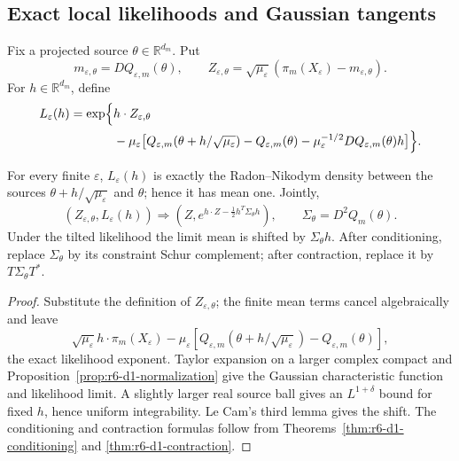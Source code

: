 \subsection{Exact local likelihoods and Gaussian tangents}

Fix a projected source \(\theta\in\mathbb R^{d_m}\).  Put
\[
m_{\varepsilon,\theta}=DQ_{\varepsilon,m}(\theta),
\qquad
Z_{\varepsilon,\theta}=
\sqrt{\mu_\varepsilon}
(\pi_m(X_\varepsilon)-m_{\varepsilon,\theta}).
\]
For \(h\in\mathbb R^{d_m}\), define
\[
\begin{aligned}
L_\varepsilon(h)=\exp\Bigl\{&
 h\cdot Z_{\varepsilon,\theta}\\
&-\mu_\varepsilon\bigl[
Q_{\varepsilon,m}(\theta+h/\sqrt{\mu_\varepsilon})
-Q_{\varepsilon,m}(\theta)
-\mu_\varepsilon^{-1/2}DQ_{\varepsilon,m}(\theta)h
\bigr]
\Bigr\}.
\end{aligned}
\]

\begin{theorem}
\label{thm:r6-d1-lan}
For every finite \(\varepsilon\), \(L_\varepsilon(h)\) is exactly the
Radon--Nikodym density between the sources
\(\theta+h/\sqrt{\mu_\varepsilon}\) and \(\theta\); hence it has mean one.
Jointly,
\[
(Z_{\varepsilon,\theta},L_\varepsilon(h))
\Longrightarrow
\left(Z,
 e^{h\cdot Z-\frac12h^T\Sigma_\theta h}
\right),
\qquad
\Sigma_\theta=D^2Q_m(\theta).
\]
Under the tilted likelihood the limit mean is shifted by
\(\Sigma_\theta h\).  After conditioning, replace \(\Sigma_\theta\) by its
constraint Schur complement; after contraction, replace it by
\(T\Sigma_\theta T^*\).
\end{theorem}

\begin{proof}
Substitute the definition of \(Z_{\varepsilon,\theta}\); the finite mean terms
cancel algebraically and leave
\[
\sqrt{\mu_\varepsilon}h\cdot\pi_m(X_\varepsilon)
-\mu_\varepsilon
[Q_{\varepsilon,m}(\theta+h/\sqrt{\mu_\varepsilon})
-Q_{\varepsilon,m}(\theta)],
\]
the exact likelihood exponent.  Taylor expansion on a larger complex compact
and Proposition~\ref{prop:r6-d1-normalization} give the Gaussian
characteristic function and likelihood limit.  A slightly larger real source
ball gives an \(L^{1+\delta}\) bound for fixed \(h\), hence uniform
integrability.  Le Cam's third lemma gives the shift.  The conditioning and
contraction formulas follow from
Theorems~\ref{thm:r6-d1-conditioning} and
\ref{thm:r6-d1-contraction}.
\end{proof}

